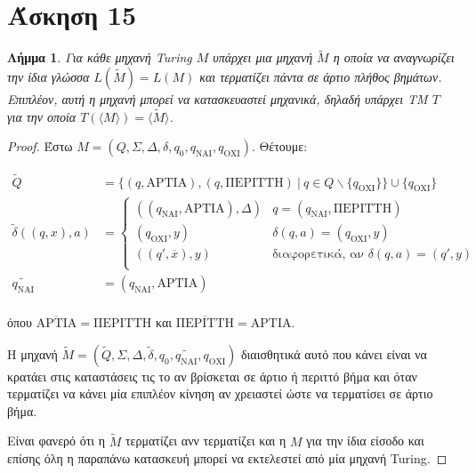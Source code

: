 \documentclass[a4paper, oneside, 11pt]{article}
\newtheorem{lm}[thm]{Λήμμα}
\theoremstyle{definition}
\begin{document}
\section*{Άσκηση 15}

\begin{lm}
Για κάθε μηχανή Turing $Μ$ υπάρχει μια μηχανή $\widetilde{M}$ η οποία να αναγνωρίζει
την ίδια γλώσσα $L(\widetilde{M}) = L(M)$ και τερματίζει πάντα σε άρτιο πλήθος
βημάτων.
Επιπλέον, αυτή η μηχανή μπορεί να κατασκευαστεί μηχανικά, δηλαδή
υπάρχει TM $T$ για την οποία $T(\langle M \rangle) = \langle \widetilde{M} \rangle$.
\end{lm}

\begin{proof}
Έστω $M = (Q, \Sigma, \Delta, \delta, q_0, q_\text{ΝΑΙ}, q_\text{ΟΧΙ})$.
Θέτουμε:

\begin{align*}
\widetilde{Q} &= \{ (q, \text{ΑΡΤΙΑ}), (q, \text{ΠΕΡΙΤΤΗ})\ |\ q \in Q\backslash
   \{q_\text{ΟΧΙ}\} \} \cup \{ q_\text{ΟΧΙ} \}\\
\widetilde{\delta}( (q, x), a ) &= 
\left\{
   \begin{array}{ll}
      ((q_\text{ΝΑΙ}, \text{ΑΡΤΙΑ}), \Delta) & q = ( q_\text{ΝΑΙ}, \text{ΠΕΡΙΤΤΗ} )\\
      (q_\text{ΟΧΙ}, y) \ & \delta(q, a) = (q_\text{ΟΧΙ}, y) \\
      ((q', \overline{x}), y) & \text{διαφορετικά, αν } \delta(q, a) = (q', y)\\
   \end{array}
\right.\\
\widetilde{q_\text{ΝΑΙ}} &= (q_\text{ΝΑΙ}, \text{ΑΡΤΙΑ})\\
\end{align*}

όπου $\overline{\text{ΑΡΤΙΑ}} = \text{ΠΕΡΙΤΤΗ}$ και $\overline{\text{ΠΕΡΙΤΤΗ}} =
\text{ΑΡΤΙΑ}$.

Η μηχανή $\widetilde{M} = (\widetilde{Q}, \Sigma, \Delta, \widetilde{\delta}, q_0,
\widetilde{q_\text{ΝΑΙ}}, q_\text{ΟΧΙ})$ διαισθητικά αυτό που κάνει είναι να κρατάει
στις καταστάσεις τις το αν βρίσκεται σε άρτιο ή περιττό βήμα και όταν τερματίζει να
κάνει μία επιπλέον κίνηση αν χρειαστεί ώστε να τερματίσει σε άρτιο βήμα.

Είναι φανερό ότι η $\widetilde{M}$ τερματίζει ανν τερματίζει και η $M$ για την ίδια
είσοδο και επίσης όλη η παραπάνω κατασκευή μπορεί να εκτελεστεί από μία μηχανή
Turing.
\end{proof}
\end{document}
